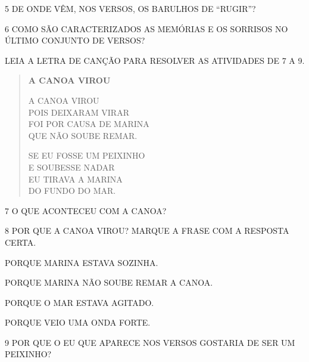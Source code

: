 \num{5} DE ONDE VÊM, NOS VERSOS, OS BARULHOS DE ``RUGIR''?


\num{6} COMO SÃO CARACTERIZADOS AS MEMÓRIAS E OS SORRISOS NO ÚLTIMO CONJUNTO DE VERSOS?


LEIA A LETRA DE CANÇÃO PARA RESOLVER AS ATIVIDADES DE 7 A 9.

\begin{myquote}
\begin{verse}
\textbf{A CANOA VIROU}

A CANOA VIROU\\
POIS DEIXARAM VIRAR\\
FOI POR CAUSA DE MARINA\\
QUE NÃO SOUBE REMAR.

SE EU FOSSE UM PEIXINHO\\
E SOUBESSE NADAR\\
EU TIRAVA A MARINA\\
DO FUNDO DO MAR.
\end{verse}

\end{myquote}

\num{7} O QUE ACONTECEU COM A CANOA?



\num{8} POR QUE A CANOA VIROU? MARQUE A FRASE COM A RESPOSTA CERTA.

\begin{boxlist}
 PORQUE MARINA ESTAVA SOZINHA.

 PORQUE MARINA NÃO SOUBE REMAR A CANOA.

 PORQUE O MAR ESTAVA AGITADO.

 PORQUE VEIO UMA ONDA FORTE.
\end{boxlist}

\num{9} POR QUE O EU QUE APARECE NOS VERSOS GOSTARIA DE SER UM PEIXINHO?


